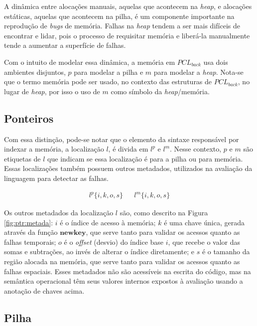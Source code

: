 A dinâmica entre alocações manuais, aquelas que acontecem na \emph{heap}, e alocações estáticas, aquelas que acontecem na pilha, é um componente importante na reprodução de \emph{bugs} de memória. Falhas na \emph{heap} tendem a ser mais difíceis de encontrar e lidar, pois o processo de requisitar memória e liberá-la manualmente tende a aumentar a superfície de falhas. 

Com o intuito de modelar essa dinâmica, a memória em $PCL_{back}$ usa dois ambientes disjuntos, $p$ para modelar a pilha e $m$ para modelar a \emph{heap}. Nota-se que o termo memória pode ser usado, no contexto das estruturas de $PCL_{back}$, no lugar de \emph{heap}, por isso o uso de $m$ como símbolo da \emph{heap}/memória.

\subsection{Ponteiros}
\label{sec:pcl-back:ptr}

Com essa distinção, pode-se notar que o elemento da sintaxe responsável por indexar a memória, a localização $l$, é divida em $l^p$ e $l^m$. Nesse contexto, $p$ e $m$ são etiquetas de $l$ que indicam se essa localização é para a pilha ou para memória. Essas localizações também possuem outros metadados, utilizados na avaliação da linguagem para detectar as falhas. 

\begin{figure*}[ht]
	\begin{align*}
		l^p\{i, k, o, s \} && l^m\{i, k, o, s \}
	\end{align*}
	\caption{\emph{Layout} dos metadados dos locais.}
	\label{fig:ptr:metada}
\end{figure*}

Os outros metadados da localização $l$ são, como descrito na Figura \ref{fig:ptr:metada}: $i$ é o índice de acesso à memória; $k$ é uma chave única, gerada através da função $\mathbf{newkey}$, que serve tanto para validar os acessos quanto as falhas temporais; $o$ é o \emph{offset} (desvio) do índice base $i$, que recebe o valor das somas e subtrações, ao invés de alterar o índice diretamente; e $s$ é o tamanho da região alocada na memória, que serve tanto para validar os acessos quanto as falhas espaciais. Esses metadados não são acessíveis na escrita do código, mas na semântica operacional têm seus valores internos expostos à avaliação usando a anotação de chaves acima.

\subsection{Pilha}
\label{sec:pcl-back:pilha}

